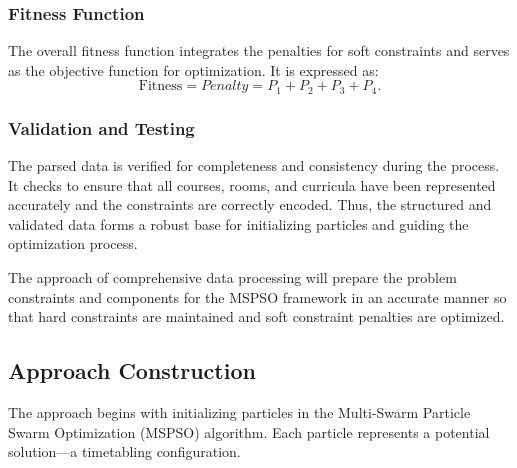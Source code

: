 \subsubsection*{Fitness Function}

The overall fitness function integrates the penalties for soft constraints and serves as the objective function for optimization. It is expressed as:
\[
\text{Fitness} = Penalty = P_1 + P_2 + P_3 + P_4.
\]

\subsubsection*{Validation and Testing}

The parsed data is verified for completeness and consistency during the process. It checks to ensure that all courses, rooms, and curricula have been represented accurately and the constraints are correctly encoded. Thus, the structured and validated data forms a robust base for initializing particles and guiding the optimization process.

The approach of comprehensive data processing will prepare the problem constraints and components for the MSPSO framework in an accurate manner so that hard constraints are maintained and soft constraint penalties are optimized.

\subsection{Approach Construction}
\label{subsec:approach_construction}

The approach begins with initializing particles in the Multi-Swarm Particle Swarm Optimization (MSPSO) algorithm. Each particle represents a potential solution—a timetabling configuration. 

